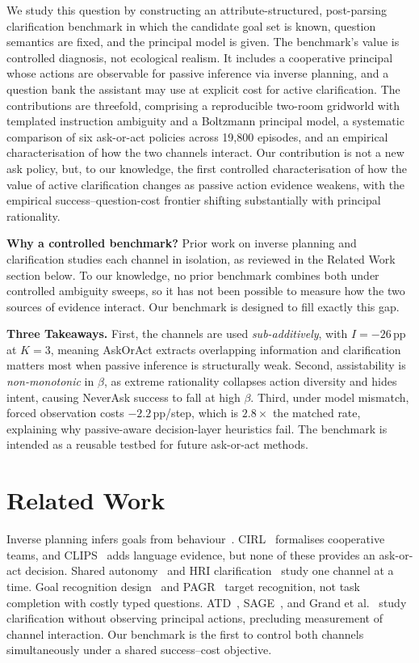 \documentclass[10pt,twocolumn]{article}
\begin{document}
We study this question by constructing an attribute-structured, post-parsing clarification benchmark in which the candidate goal set is known, question semantics are fixed, and the principal model is given.
The benchmark's value is controlled diagnosis, not ecological realism.
It includes a cooperative principal whose actions are observable for passive inference via inverse planning, and a question bank the assistant may use at explicit cost for active clarification.
The contributions are threefold, comprising a reproducible two-room gridworld with templated instruction ambiguity and a Boltzmann principal model, a systematic comparison of six ask-or-act policies across 19{,}800 episodes, and an empirical characterisation of how the two channels interact.
Our contribution is not a new ask policy, but, to our knowledge, the first controlled characterisation of how the value of active clarification changes as passive action evidence weakens, with the empirical success--question-cost frontier shifting substantially with principal rationality.

\textbf{Why a controlled benchmark?}
Prior work on inverse planning and clarification studies each channel in isolation, as reviewed in the Related Work section below.
To our knowledge, no prior benchmark combines both under controlled ambiguity sweeps, so it has not been possible to measure how the two sources of evidence interact.
Our benchmark is designed to fill exactly this gap.

\textbf{Three Takeaways.}
First, the channels are used \emph{sub-additively}, with $I{=}{-}26$\,pp at $K{=}3$, meaning AskOrAct extracts overlapping information and clarification matters most when passive inference is structurally weak.
Second, assistability is \emph{non-monotonic} in $\beta$, as extreme rationality collapses action diversity and hides intent, causing NeverAsk success to fall at high $\beta$.
Third, under model mismatch, forced observation costs $-2.2$\,pp/step, which is $2.8\times$ the matched rate, explaining why passive-aware decision-layer heuristics fail.
The benchmark is intended as a reusable testbed for future ask-or-act methods.

\section{Related Work}
\label{sec:related}

Inverse planning infers goals from behaviour~\cite{baker2009,ramirez2010plan}. CIRL~\cite{hadfield2016cirl} formalises cooperative teams, and CLIPS~\cite{tan2024clips} adds language evidence, but none of these provides an ask-or-act decision.
Shared autonomy~\cite{javdani2015shared} and HRI clarification~\cite{tellex2014asking,cakmak2012designing} study one channel at a time.
Goal recognition design~\cite{keren2014grd,dragan2013legibility} and PAGR~\cite{zhang2025pagr} target recognition, not task completion with costly typed questions.
ATD~\cite{kobalczyk2025active}, SAGE~\cite{suri2025structured}, and Grand et al.~\cite{grand2026shoot} study clarification without observing principal actions, precluding measurement of channel interaction.
Our benchmark is the first to control both channels simultaneously under a shared success--cost objective.
\end{document}

